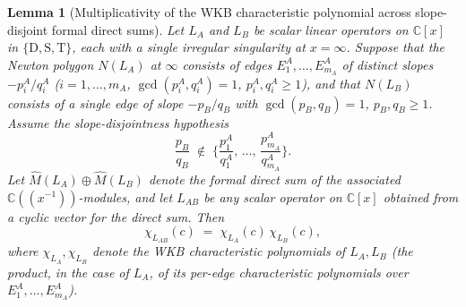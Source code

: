\documentclass[11pt,a4paper]{article}
\theoremstyle{plain}
\newtheorem{lemma}[theorem]{Lemma}
\theoremstyle{definition}
\theoremstyle{remark}
\newcommand{\opD}{\mathrm{D}}                     %
\newcommand{\opS}{\mathrm{S}}                     %
\newcommand{\opT}{\mathrm{T}}                     %
\begin{document}
\begin{lemma}[Multiplicativity of the WKB characteristic polynomial
across slope-disjoint formal direct sums]\label{lem:chi-multiplicative}
Let $L_A$ and $L_B$ be scalar linear operators on $\mathbb{C}[x]$ in
$\{\opD, \opS, \opT\}$, each with a single irregular singularity at
$x = \infty$. Suppose that the Newton polygon $N(L_A)$ at $\infty$
consists of edges $E_1^A, \dots, E_{m_A}^A$ of distinct slopes
$-p_i^A / q_i^A$ ($i = 1, \dots, m_A$, $\gcd(p_i^A, q_i^A) = 1$,
$p_i^A, q_i^A \ge 1$), and that $N(L_B)$ consists of a \emph{single}
edge of slope $-p_B / q_B$ with $\gcd(p_B, q_B) = 1$, $p_B, q_B \ge 1$.
Assume the slope-disjointness hypothesis
\begin{equation}\label{eq:slope-disjoint}
   \frac{p_B}{q_B} \;\notin\; \Big\{\frac{p_1^A}{q_1^A},\,
   \dots,\, \frac{p_{m_A}^A}{q_{m_A}^A}\Big\}.
\end{equation}
Let $\widehat{M}(L_A) \oplus \widehat{M}(L_B)$ denote the formal direct
sum of the associated $\mathbb{C}((x^{-1}))$-modules, and let $L_{AB}$
be any scalar operator on $\mathbb{C}[x]$ obtained from a cyclic vector
for the direct sum. Then
\[
   \chi_{L_{AB}}(c) \;=\; \chi_{L_A}(c)\, \chi_{L_B}(c),
\]
where $\chi_{L_A}, \chi_{L_B}$ denote the WKB characteristic polynomials
of $L_A, L_B$ (the product, in the case of $L_A$, of its per-edge
characteristic polynomials over $E_1^A, \dots, E_{m_A}^A$).
\end{lemma}
\end{document}
